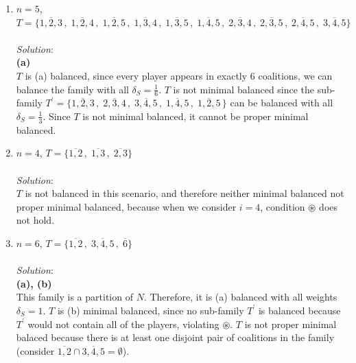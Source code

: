 \documentclass{article}
\begin{document}
\begin{enumerate}
    \begin{enumerate}
    \item $n = 5$, $T = \{\overline{1, 2, 3}\,, \; \overline{1, 2, 4}\,, \; \overline{1, 2, 5}\,, \; \overline{1, 3, 4}\,, \; \overline{1, 3, 5}\,, \; \overline{1, 4, 5}\,, \; \overline{2, 3, 4}\,, \; \overline{2, 3, 5}\,, \; \overline{2, 4, 5}\,, \; \overline{3, 4, 5}\}$\\\\
    \textit{Solution}:\\
    \textbf{(a)} \\
    $T$ is (a) balanced, since every player appears in exactly $6$ coalitions, we can balance the family with all $\delta_{S} = \frac{1}{6}$. $T$ is not minimal balanced since the sub-family $T^{\prime} = \{\overline{1, 2, 3}\,, \; \overline{2, 3, 4}\,, \; \overline{3, 4, 5}\,, \; \overline{1, 4, 5}\,, \; \overline{1, 2, 5}\,\}$ can be balanced with all $\delta_{S} = \frac{1}{3}$. Since $T$ is not minimal balanced, it cannot be proper minimal balanced.
    \\

    \item $n = 4$, $T = \{\overline{1, 2}\,, \; \overline{1, 3}\,, \; \overline{2, 3}\}$\\\\
    \textit{Solution}:\\
    $T$ is not balanced in this scenario, and therefore neither minimal balanced not proper minimal balanced, because when we consider $i = 4$, condition $\circledast$ does not hold.
    \\

    \item $n = 6$, $T = \{\overline{1, 2}\,, \; \overline{3, 4, 5}\,, \; \overline{6}\}$\\\\
    \textit{Solution}:\\
    \textbf{(a), (b)}\\
    This family is a partition of $N$. Therefore, it is (a) balanced with all weights $\delta_{S} = 1$. $T$ is (b) minimal balanced, since no sub-family $T^{\prime}$ is balanced because $T^{\prime}$ would not contain all of the players, violating $\circledast$. $T$ is not proper minimal balaced because there is at least one disjoint pair of coalitions in the family (consider $\overline{1, 2} \cap \overline{3, 4, 5} = \emptyset$).
    \\


\end{enumerate}
\end{enumerate}
\end{document}
